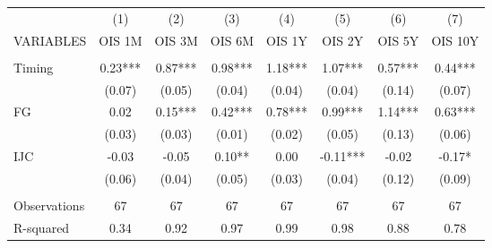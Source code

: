 \begin{tabular}{lccccccc} \hline
 & (1) & (2) & (3) & (4) & (5) & (6) & (7) \\
VARIABLES & OIS 1M & OIS 3M & OIS 6M & OIS 1Y & OIS 2Y & OIS 5Y & OIS 10Y \\ \hline
 &  &  &  &  &  &  &  \\
Timing & 0.23*** & 0.87*** & 0.98*** & 1.18*** & 1.07*** & 0.57*** & 0.44*** \\
 & (0.07) & (0.05) & (0.04) & (0.04) & (0.04) & (0.14) & (0.07) \\
FG & 0.02 & 0.15*** & 0.42*** & 0.78*** & 0.99*** & 1.14*** & 0.63*** \\
 & (0.03) & (0.03) & (0.01) & (0.02) & (0.05) & (0.13) & (0.06) \\
IJC & -0.03 & -0.05 & 0.10** & 0.00 & -0.11*** & -0.02 & -0.17* \\
 & (0.06) & (0.04) & (0.05) & (0.03) & (0.04) & (0.12) & (0.09) \\
 &  &  &  &  &  &  &  \\
Observations & 67 & 67 & 67 & 67 & 67 & 67 & 67 \\
 R-squared & 0.34 & 0.92 & 0.97 & 0.99 & 0.98 & 0.88 & 0.78 \\ \hline
\end{tabular}
